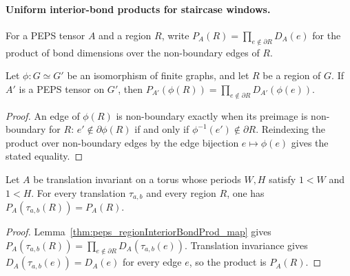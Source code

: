 \paragraph{Uniform interior-bond products for staircase windows.}

For a PEPS tensor $A$ and a region $R$, write
$P_A(R)=\prod_{e\notin\partial R} D_A(e)$ for the product of bond dimensions
over the non-boundary edges of $R$.

\begin{lemma}%
    \label{thm:peps_regionInteriorBondProd_map}
    \leanok
    Let $\phi:G\simeq G'$ be an isomorphism of finite graphs, and let $R$ be
    a region of $G$. If $A'$ is a PEPS tensor on $G'$, then
    $P_{A'}(\phi(R))
        =\prod_{e\notin\partial R} D_{A'}(\phi(e))$.
\end{lemma}
\begin{proof}
    \leanok
    An edge of $\phi(R)$ is non-boundary exactly when its preimage is
    non-boundary for $R$:
    $e'\notin\partial\phi(R)$ if and only if
    $\phi^{-1}(e')\notin\partial R$.
    Reindexing the product over non-boundary edges by the edge bijection
    $e\mapsto\phi(e)$ gives the stated equality.
\end{proof}

\begin{lemma}%
    \label{thm:peps_regionInteriorBondProd_translate}
    \leanok
    Let $A$ be translation invariant on a torus whose periods $W,H$ satisfy
    $1<W$ and $1<H$. For every translation $\tau_{a,b}$ and every region $R$,
    one has $P_A(\tau_{a,b}(R))=P_A(R)$.
\end{lemma}
\begin{proof}
    \leanok
    Lemma~\ref{thm:peps_regionInteriorBondProd_map} gives
    $P_A(\tau_{a,b}(R))
        =\prod_{e\notin\partial R}D_A(\tau_{a,b}(e))$.
    Translation invariance gives $D_A(\tau_{a,b}(e))=D_A(e)$ for every
    edge $e$, so the product is $P_A(R)$.
\end{proof}

